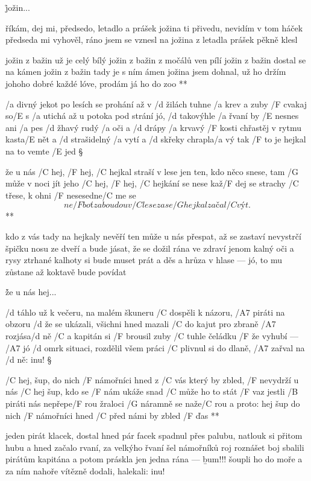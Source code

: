 \r jožin...

říkám, dej mi, předsedo, letadlo a prášek
jožina ti přivedu, nevidím v tom háček
předseda mi vyhověl, ráno jsem se vznesl
na jožina z letadla prášek pěkně klesl \s

\R jožin z bažin už je celý bílý
   jožin z bažin z močálů ven pílí
   jožin z bažin dostal se na kámen
   jožin z bažin tady je s ním ámen
   jožina jsem dohnal, už ho držím johoho
   dobré každé lóve, prodám já ho do zoo **




/a divný jekot po lesích se prohání
až v /d žilách tuhne /a krev a zuby /F cvakaj so/E s
/a utichá až u potoka pod strání
jó, /d takovýhle /a řvaní by /E nesnes ani /a pes
/d žhavý rudý /a oči a /d drápy /a krvavý
/F kosti chřastěj v rytmu kasta/E nět
a /d strašidelný /a vytí a /d skřeky chrapla/a vý
tak /F to je hejkal na to vemte /E jed \S

\R že u nás /C hej, /F hej, /C hejkal straší v lese
   jen ten, kdo něco snese, tam /G může v noci jít
   jeho /C hej, /F hej, /C hejkání se nese
   kaž/F dej se strachy /C třese, k ohni /F nesesedne/C me se
   \[ ne/F boť za boudou v /C lese zase /G hejkal začal /C výt. \]**

kdo z vás tady na hejkaly nevěří
ten může u nás přespat, až se zastaví
nevystrčí špičku nosu ze dveří
a bude jásat, že se dožil rána ve zdraví
jenom kalný oči a rysy ztrhané
kalhoty si bude muset prát
a děs a hrůza v hlase --- jó, to mu zůstane
až koktavě bude povídat \s

\r že u nás hej...




/d táhlo už k večeru, na malém škuneru
/C dospěli k názoru, /A7 piráti na obzoru
/d že se ukázali, všichni hned mazali
/C do kajut pro zbraně /A7 rozjása/d ně
/C a kapitán si /F brousil zuby
/C tuhle čeládku /F že vyhubí --- /A7 jó
/d omrk situaci, rozdělil všem práci
/C plivnul si do dlaně, /A7 zařval na /d ně: inu! \S

\R /C hej, šup, do nich /F námořníci hned
   z /C vás který by zbled, /F nevydrží u nás
   /C hej šup, kdo se /F nám ukáže snad
   /C může ho to stát /F vaz
   jestli /B piráti nás nepřepe/F rou
   žraloci /G náramně se naže/C rou a proto:
   hej šup do nich /F námořníci hned
   /C před námi by zbled /F ďas **

jeden pirát klacek, dostal hned pár facek
spadnul přes palubu, natlouk si přitom hubu
a hned začalo rvaní, za velkýho řvaní
šel námořníků roj roznášet boj
sbalili pirátům kapitána
a potom práskla jen jedna rána --- {\b bum!!!}
šoupli ho do moře a za ním nahoře
vítězně dodali, halekali: inu! \s

